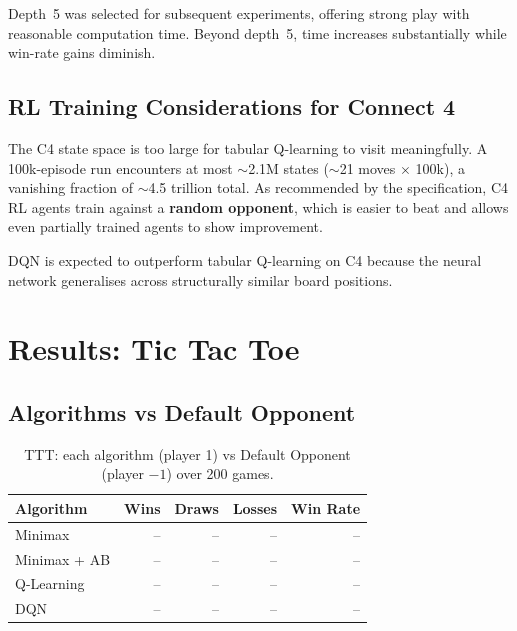 \documentclass[12pt, a4paper]{article}
\begin{document}
Depth~5 was selected for subsequent experiments, offering strong play with reasonable
computation time. Beyond depth~5, time increases substantially while win-rate gains diminish.


\subsection{RL Training Considerations for Connect 4}

The C4 state space is too large for tabular Q-learning to visit meaningfully. A 100k-episode
run encounters at most $\sim$2.1M states ($\sim$21 moves $\times$ 100k), a vanishing fraction
of $\sim$4.5 trillion total. As recommended by the specification, C4 RL agents train against
a \textbf{random opponent}, which is easier to beat and allows even partially trained agents
to show improvement.

DQN is expected to outperform tabular Q-learning on C4 because the neural network generalises
across structurally similar board positions.


\section{Results: Tic Tac Toe}

\subsection{Algorithms vs Default Opponent}


\begin{table}[H]
\centering
\caption{TTT: each algorithm (player 1) vs Default Opponent (player $-1$) over 200 games.}
\label{tab:ttt_vs_default}
\small
\begin{tabular}{lrrrr}
\toprule
\textbf{Algorithm} & \textbf{Wins} & \textbf{Draws} & \textbf{Losses} & \textbf{Win Rate} \\
\midrule
Minimax              & -- & -- & -- & -- \\
Minimax + AB         & -- & -- & -- & -- \\
Q-Learning           & -- & -- & -- & -- \\
DQN                  & -- & -- & -- & -- \\
\bottomrule
\end{tabular}
\end{table}
\end{document}

